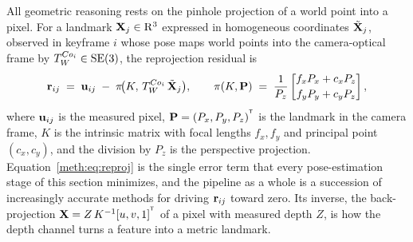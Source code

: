 All geometric reasoning rests on the pinhole projection of a world point into a pixel. For a landmark $\mathbf{X}_j\in\mathrm{R}^3$ expressed in homogeneous coordinates $\tilde{\mathbf{X}}_j$, observed in keyframe $i$ whose pose maps world points into the camera-optical frame by $T^{Co_i}_{W}\in\mathrm{SE}(3)$, the reprojection residual is
\begin{equation}
\mathbf{r}_{ij} \;=\; \mathbf{u}_{ij} \;-\; \pi\!\big(K,\,T^{Co_i}_{W}\,\tilde{\mathbf{X}}_j\big),
\qquad
\pi(K,\mathbf{P}) \;=\; \frac{1}{P_z}\begin{bmatrix} f_x P_x + c_x P_z \\[2pt] f_y P_y + c_y P_z \end{bmatrix},
\label{meth:eq:reproj}
\end{equation}
where $\mathbf{u}_{ij}$ is the measured pixel, $\mathbf{P}=(P_x,P_y,P_z)^{^{\mathsf{T}}}$ is the landmark in the camera frame, $K$ is the intrinsic matrix with focal lengths $f_x,f_y$ and principal point $(c_x,c_y)$, and the division by $P_z$ is the perspective projection. Equation~\eqref{meth:eq:reproj} is the single error term that every pose-estimation stage of this section minimizes, and the pipeline as a whole is a succession of increasingly accurate methods for driving $\mathbf{r}_{ij}$ toward zero. Its inverse, the back-projection $\mathbf{X} = Z\,K^{-1}[u,v,1]^{^{\mathsf{T}}}$ of a pixel with measured depth $Z$, is how the depth channel turns a feature into a metric landmark.

